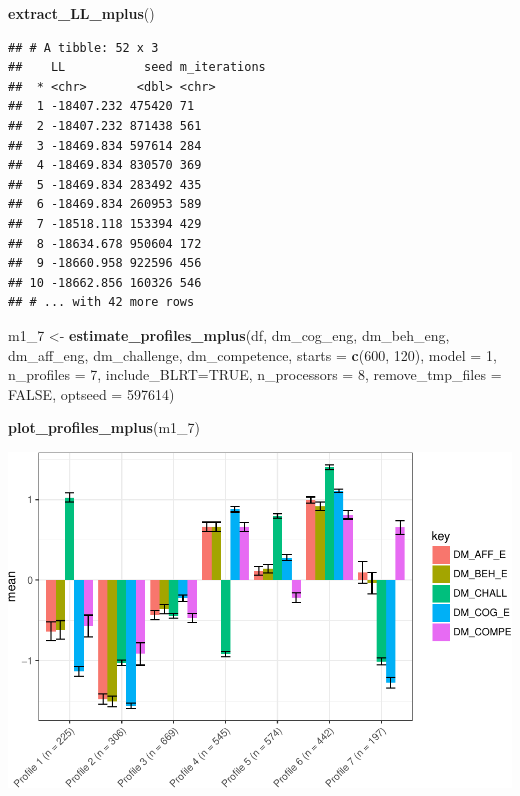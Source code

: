 \documentclass[]{book}
\newenvironment{Shaded}{\begin{snugshade}}{\end{snugshade}}
\newcommand{\KeywordTok}[1]{\textcolor[rgb]{0.13,0.29,0.53}{\textbf{#1}}}
\newcommand{\DataTypeTok}[1]{\textcolor[rgb]{0.13,0.29,0.53}{#1}}
\newcommand{\DecValTok}[1]{\textcolor[rgb]{0.00,0.00,0.81}{#1}}
\newcommand{\StringTok}[1]{\textcolor[rgb]{0.31,0.60,0.02}{#1}}
\newcommand{\OtherTok}[1]{\textcolor[rgb]{0.56,0.35,0.01}{#1}}
\newcommand{\NormalTok}[1]{#1}
\begin{document}
\begin{Shaded}
\begin{Highlighting}[]
\KeywordTok{extract_LL_mplus}\NormalTok{()}
\end{Highlighting}
\end{Shaded}

\begin{verbatim}
## # A tibble: 52 x 3
##    LL           seed m_iterations
##  * <chr>       <dbl> <chr>       
##  1 -18407.232 475420 71          
##  2 -18407.232 871438 561         
##  3 -18469.834 597614 284         
##  4 -18469.834 830570 369         
##  5 -18469.834 283492 435         
##  6 -18469.834 260953 589         
##  7 -18518.118 153394 429         
##  8 -18634.678 950604 172         
##  9 -18660.958 922596 456         
## 10 -18662.856 160326 546         
## # ... with 42 more rows
\end{verbatim}

\begin{Shaded}
\begin{Highlighting}[]
\NormalTok{m1_}\DecValTok{7}\NormalTok{ <-}\StringTok{ }\KeywordTok{estimate_profiles_mplus}\NormalTok{(df,  }
\NormalTok{                             dm_cog_eng, dm_beh_eng, dm_aff_eng, dm_challenge, dm_competence,}
                             \DataTypeTok{starts =} \KeywordTok{c}\NormalTok{(}\DecValTok{600}\NormalTok{, }\DecValTok{120}\NormalTok{),}
                             \DataTypeTok{model =} \DecValTok{1}\NormalTok{,}
                             \DataTypeTok{n_profiles =} \DecValTok{7}\NormalTok{,}
                             \DataTypeTok{include_BLRT=}\OtherTok{TRUE}\NormalTok{,}
                             \DataTypeTok{n_processors =} \DecValTok{8}\NormalTok{, }\DataTypeTok{remove_tmp_files =} \OtherTok{FALSE}\NormalTok{, }\DataTypeTok{optseed =} \DecValTok{597614}\NormalTok{)}

\KeywordTok{plot_profiles_mplus}\NormalTok{(m1_}\DecValTok{7}\NormalTok{)}
\end{Highlighting}
\end{Shaded}

\includegraphics{rosenberg-dissertation_files/figure-latex/anotherm1-7-solution-1.pdf}
\end{document}
